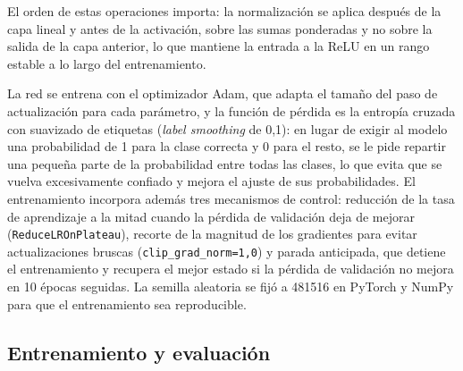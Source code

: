 El orden de estas operaciones importa: la normalización se aplica después de la capa lineal y antes de la activación, sobre las sumas ponderadas y no sobre la salida de la capa anterior, lo que mantiene la entrada a la ReLU en un rango estable a lo largo del entrenamiento.\newline

La red se entrena con el optimizador Adam, que adapta el tamaño del paso de actualización para cada parámetro, y la función de pérdida es la entropía cruzada con suavizado de etiquetas (\textit{label smoothing} de 0,1): en lugar de exigir al modelo una probabilidad de 1 para la clase correcta y 0 para el resto, se le pide repartir una pequeña parte de la probabilidad entre todas las clases, lo que evita que se vuelva excesivamente confiado y mejora el ajuste de sus probabilidades. El entrenamiento incorpora además tres mecanismos de control: reducción de la tasa de aprendizaje a la mitad cuando la pérdida de validación deja de mejorar (\texttt{ReduceLROnPlateau}), recorte de la magnitud de los gradientes para evitar actualizaciones bruscas (\texttt{clip\_grad\_norm=1,0}) y parada anticipada, que detiene el entrenamiento y recupera el mejor estado si la pérdida de validación no mejora en 10 épocas seguidas. La semilla aleatoria se fijó a 481516 en PyTorch y NumPy para que el entrenamiento sea reproducible.


\subsection{Entrenamiento y evaluación}
\label{subsec:impl_lpmc_entrenamiento}


